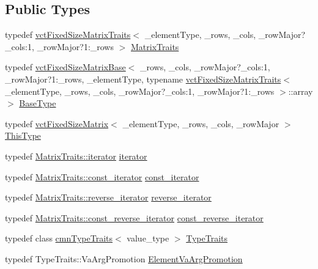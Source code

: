 \subsection*{Public Types}
\begin{DoxyCompactItemize}
\item 
typedef \hyperlink{classvct_fixed_size_matrix_traits}{vct\+Fixed\+Size\+Matrix\+Traits}$<$ \+\_\+element\+Type, \+\_\+rows, \+\_\+cols, \+\_\+row\+Major?\+\_\+cols\+:1, \+\_\+row\+Major?1\+:\+\_\+rows $>$ \hyperlink{classvct_fixed_size_matrix_a29b71912a8827d4baca637aebfe41eca}{Matrix\+Traits}
\item 
typedef \hyperlink{classvct_fixed_size_matrix_base}{vct\+Fixed\+Size\+Matrix\+Base}$<$ \+\_\+rows, \+\_\+cols, \+\_\+row\+Major?\+\_\+cols\+:1, \+\_\+row\+Major?1\+:\+\_\+rows, \+\_\+element\+Type, typename \hyperlink{classvct_fixed_size_matrix_traits}{vct\+Fixed\+Size\+Matrix\+Traits}$<$ \+\_\+element\+Type, \+\_\+rows, \+\_\+cols, \+\_\+row\+Major?\+\_\+cols\+:1, \+\_\+row\+Major?1\+:\+\_\+rows $>$\+::array $>$ \hyperlink{classvct_fixed_size_matrix_a9d96b338cbb52283cdb817b6b497feb5}{Base\+Type}
\item 
typedef \hyperlink{classvct_fixed_size_matrix}{vct\+Fixed\+Size\+Matrix}$<$ \+\_\+element\+Type, \+\_\+rows, \+\_\+cols, \+\_\+row\+Major $>$ \hyperlink{classvct_fixed_size_matrix_a45edd9a8b579712a59b766f04e1acfec}{This\+Type}
\item 
typedef \hyperlink{classvct_fixed_size_matrix_traits_a677065481ada218e2559cdec92e97fd8}{Matrix\+Traits\+::iterator} \hyperlink{classvct_fixed_size_matrix_a3512c7acacb6065a802898949cb78f43}{iterator}
\item 
typedef \hyperlink{classvct_fixed_size_matrix_traits_a8f7178fb03f45772c705fba16e08065d}{Matrix\+Traits\+::const\+\_\+iterator} \hyperlink{classvct_fixed_size_matrix_a6f5d0f13f38c1ccc8f736e6d0d5c8fb3}{const\+\_\+iterator}
\item 
typedef \hyperlink{classvct_fixed_size_matrix_traits_aa132098455575ae9bc4962c994273baa}{Matrix\+Traits\+::reverse\+\_\+iterator} \hyperlink{classvct_fixed_size_matrix_afd9b320069fbb9b20f3dc11d767b57c9}{reverse\+\_\+iterator}
\item 
typedef \hyperlink{classvct_fixed_size_matrix_traits_a362cff0931f811552609307e80af3eab}{Matrix\+Traits\+::const\+\_\+reverse\+\_\+iterator} \hyperlink{classvct_fixed_size_matrix_a0f130f24813be72cfe2c68af25f55c9a}{const\+\_\+reverse\+\_\+iterator}
\item 
typedef class \hyperlink{classcmn_type_traits}{cmn\+Type\+Traits}$<$ value\+\_\+type $>$ \hyperlink{classvct_fixed_size_matrix_af4fb2be82acfa34201da6c7f21ad0e68}{Type\+Traits}
\item 
typedef Type\+Traits\+::\+Va\+Arg\+Promotion \hyperlink{classvct_fixed_size_matrix_a68a3a606814298fd97f392dce89f9c7d}{Element\+Va\+Arg\+Promotion}
\end{DoxyCompactItemize}
